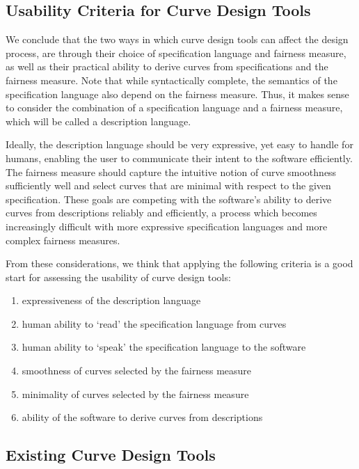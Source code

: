 \documentclass[a4paper]{article}
\begin{document}
		\subsection{Usability Criteria for Curve Design Tools}
		\label{section:usability_criteria_curve_design_tools}

			We conclude that the two ways in which curve design tools can affect the design process, are through their choice of specification language and fairness measure, as well as their practical ability to derive curves from specifications and the fairness measure. Note that while syntactically complete, the semantics of the specification language also depend on the fairness measure. Thus, it makes sense to consider the combination of a specification language and a fairness measure, which will be called a description language.

			Ideally, the description language should be very expressive, yet easy to handle for humans, enabling the user to communicate their intent to the software efficiently. The fairness measure should capture the intuitive notion of curve smoothness sufficiently well and select curves that are minimal with respect to the given specification. These goals are competing with the software's ability to derive curves from descriptions reliably and efficiently, a process which becomes increasingly difficult with more expressive specification languages and more complex fairness measures.

			From these considerations, we think that applying the following criteria is a good start for assessing the usability of curve design tools:
			\begin{enumerate}
				\item expressiveness of the description language
				\item human ability to `read' the specification language from curves
				\item human ability to `speak' the specification language to the software
				\item smoothness of curves selected by the fairness measure
				\item minimality of curves selected by the fairness measure
				\item ability of the software to derive curves from descriptions
			\end{enumerate}

		\subsection{Existing Curve Design Tools}
		\label{section:existing_curve_design_tools}
\end{document}
